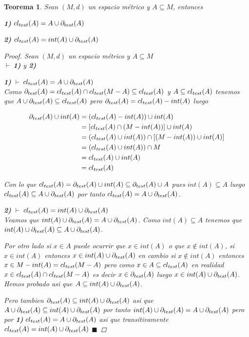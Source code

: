 \documentclass[oneside]{book} %
\theoremstyle{Teorema}
\newtheorem{Teorema}[Definicion]{Teorema}
\theoremstyle{Ejemplos}
\theoremstyle{[Obs]}
\def \test {test}
\newcommand{\cerradura}[2][\test]{\ifx \test #1 {\overline{#2}} \else {cl_{#1}(#2)} \fi} %
\newcommand{\frontera}[2][\test]{\ifx \test #1 {\partial(#2)} \else {\partial_{#1}(#2)} \fi} %
\renewcommand{\{}{\left\lbrace} %
\renewcommand{\}}{\right\rbrace} %
\renewcommand{\u}{\cup} %
\newcommand{\n}{\cap} %
\renewcommand{\sc}{\subseteq} %
\renewcommand{\qed}{$\blacksquare$} %
\newcommand{\pd}{$\vdash\ $} %
\begin{document}
			\begin{Teorema}\setlength{\parindent}{0em}
			
				Sean $(M, d)$ un espacio métrico y $A \sc M$, entonces 

				\textbf{1)} $\cerradura{A} = A \u \frontera{A}$

				\textbf{2)} $\cerradura{A} = int(A) \u \frontera{A}$

				\begin{proof}
					
					Sean $(M, d)$ un espacio métrico y $A \sc M$ \\ 
					\pd \textbf{1)} y \textbf{2)}

					\textbf{1)} \pd $\cerradura{A} = A \u \frontera{A}$ \\ 
					Como $\frontera{A} = \cerradura{A} \n \cerradura{M - A} \sc \cerradura{A}$ y $A \sc \cerradura{A}$ tenemos que $A \u \frontera{A} \sc \cerradura{A}$ pero $\frontera{A} = \cerradura{A} - int(A)$ luego 
					
					\begin{align*}
						\frontera{A} \u int(A) &= (\cerradura{A} - int(A)) \u int(A) \\ 
						&= [\cerradura{A} \n (M - int(A))] \u int(A) \\ 
						&= (\cerradura{A} \u int(A)) \n [(M - int(A)) \u int(A)] \\ 
						&= (\cerradura{A} \u int(A)) \n M \\ 
						&= \cerradura{A} \u int(A) \\ 
						&= \cerradura{A}
					\end{align*}

					Con lo que $\cerradura{A} = \frontera{A} \u int(A) \sc \frontera{A} \u A$ pues $int(A) \sc A$ luego $\cerradura{A} \sc A \u \frontera{A}$ por tanto $\cerradura{A} = A \u \frontera{A}$.

					\textbf{2)} \pd $\cerradura{A} = int(A) \u \frontera{A}$ \\ 
					Veamos que $int(A) \u \frontera{A} = A \u \frontera{A}$. Como $int(A) \sc A$ tenemos que $int(A) \u \frontera{A} \sc A \u \frontera{A}$. 
					
					Por otro lado si $x \in A$ puede ocurrir que $x \in int(A)$ o que $x \notin int(A)$, si $x \in int(A)$ entonces $x \in int(A) \u \frontera{A}$ en cambio si $x \notin int(A)$ entonces $x \in M - int(A) = \cerradura{M - A}$ pero como $x \in A \sc \cerradura{A}$ en realidad $x \in \cerradura{A} \n \cerradura{M - A}$ es decir $x \in \frontera{A}$ luego $x \in int(A) \u \frontera{A}$. Hemos probado asi que $A \sc int(A) \u \frontera{A}$.

					Pero tambien $\frontera{A} \sc int(A) \u \frontera{A}$ asi que $A \u \frontera{A} \sc int(A) \u \frontera{A}$ por tanto $int(A) \u \frontera{A} = A \u \frontera{A}$ pero por \textbf{1)} $\cerradura{A} = A \u \frontera{A}$ asi que transitivamente $\cerradura{A} = int(A) \u \frontera{A}$ \qed

				\end{proof}
			
			\end{Teorema}
\end{document}
